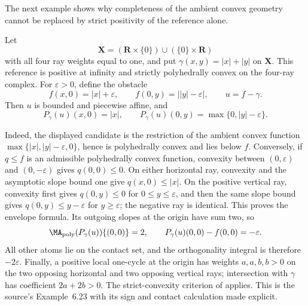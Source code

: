 The next example shows why completeness of the ambient convex geometry
cannot be replaced by strict positivity of the reference alone.

\begin{example}\label{ex:frontier-polyhedral-cross-orthogonality}
Let
\[
 \mathbf X=(\mathbf R\times\{0\})\cup(\{0\}\times\mathbf R)
\]
with all four ray weights equal to one, and put
\(\gamma(x,y)=|x|+|y|\) on \(\mathbf X\).  This reference is positive at
infinity and strictly polyhedrally convex on the four-ray complex.  For
\(\varepsilon>0\), define the obstacle
\[
 f(x,0)=|x|+\varepsilon,
 \qquad
 f(0,y)=\bigl||y|-\varepsilon\bigr|,
 \qquad u=f-\gamma.
\]
Then \(u\) is bounded and piecewise affine, and
\[
 P_\gamma(u)(x,0)=|x|,
 \qquad
 P_\gamma(u)(0,y)=\max\{0,|y|-\varepsilon\}.
\]
\end{example}

Indeed, the displayed candidate is the restriction of the ambient convex
function
\(
 \max\{|x|,|y|-\varepsilon,0\}
\), hence is polyhedrally convex and lies below \(f\).  Conversely, if
\(q\leq f\) is an admissible polyhedrally convex function, convexity between
\((0,\varepsilon)\) and \((0,-\varepsilon)\) gives \(q(0,0)\leq0\).
On either horizontal ray, convexity and the asymptotic slope bound one give
\(q(x,0)\leq|x|\).  On the positive vertical ray, convexity first gives
\(q(0,y)\leq0\) for \(0\leq y\leq\varepsilon\), and then the same slope
bound gives \(q(0,y)\leq y-\varepsilon\) for
\(y\geq\varepsilon\); the negative ray is identical.  This proves the
envelope formula.  Its outgoing slopes at the origin have sum two, so
\[
 \MA_{\mathrm{poly}}(P_\gamma(u))\{(0,0)\}=2,
 \qquad P_\gamma(u)(0,0)-f(0,0)=-\varepsilon.
\]
All other atoms lie on the contact set, and the orthogonality integral is
therefore \(-2\varepsilon\).  Finally, a positive local one-cycle at the
origin has weights \(a,a,b,b>0\) on the two opposing horizontal and two
opposing vertical rays; intersection with \(\gamma\) has coefficient
\(2a+2b>0\).  The strict-convexity criterion of
\cite[Remark~3.9]{BMPS26} applies.  This is the source's Example~6.23 with
its sign and contact calculation made explicit.

